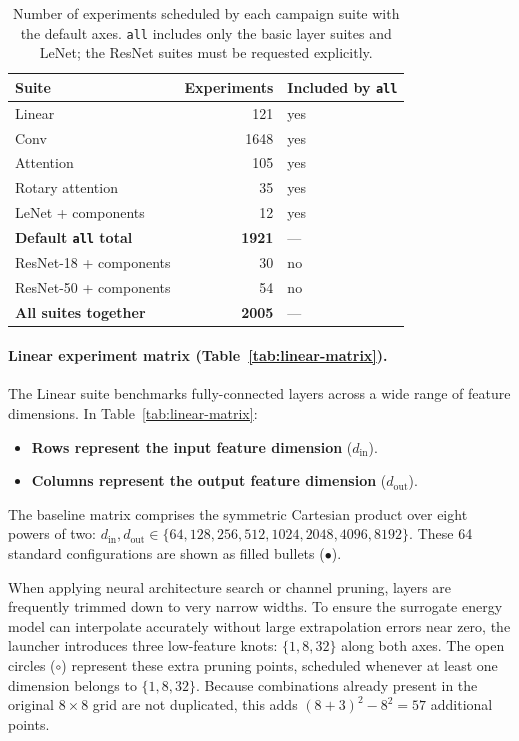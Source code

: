 \begin{table}
    \centering
    \begin{tabular}{l r l}
        \hline
        \textbf{Suite} & \textbf{Experiments} & \textbf{Included by \texttt{all}} \\
        \hline
        Linear & 121 & yes \\
        Conv & 1648 & yes \\
        Attention & 105 & yes \\
        Rotary attention & 35 & yes \\
        LeNet + components & 12 & yes \\
        \hline
        \textbf{Default \texttt{all} total} & \textbf{1921} & --- \\
        \hline
        ResNet-18 + components & 30 & no \\
        ResNet-50 + components & 54 & no \\
        \hline
        \textbf{All suites together} & \textbf{2005} & --- \\
        \hline
    \end{tabular}
    \caption{Number of experiments scheduled by each campaign suite with the
    default axes. \texttt{all} includes only the basic layer suites and
    LeNet; the ResNet suites must be requested explicitly.}
    \label{tab:campaign-suite-counts}
\end{table}

\paragraph{Linear experiment matrix (Table~\ref{tab:linear-matrix}).}
The Linear suite benchmarks fully-connected layers across a wide range of feature dimensions. In Table~\ref{tab:linear-matrix}:
\begin{itemize}
    \item \textbf{Rows represent the input feature dimension} ($d_{\text{in}}$).
    \item \textbf{Columns represent the output feature dimension} ($d_{\text{out}}$).
\end{itemize}
The baseline matrix comprises the symmetric Cartesian product over eight powers of two: $d_{\text{in}}, d_{\text{out}} \in \{64, 128, 256, 512, 1024, 2048, 4096, 8192\}$. These 64 standard configurations are shown as filled bullets ($\bullet$). 

When applying neural architecture search or channel pruning, layers are frequently trimmed down to very narrow widths. To ensure the surrogate energy model can interpolate accurately without large extrapolation errors near zero, the launcher introduces three low-feature knots: $\{1, 8, 32\}$ along both axes. The open circles ($\circ$) represent these extra pruning points, scheduled whenever at least one dimension belongs to $\{1, 8, 32\}$. Because combinations already present in the original $8 \times 8$ grid are not duplicated, this adds $(8+3)^2 - 8^2 = 57$ additional points.

